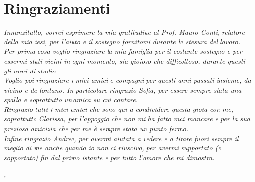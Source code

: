 
\cleardoublepage
{}
{}



\bigskip

\begingroup
\let\clearpage\relax
\let\cleardoublepage\relax
\let\cleardoublepage\relax

\chapter*{Ringraziamenti}

\noindent \textit{Innanzitutto, vorrei esprimere la mia gratitudine al Prof. Mauro Conti, relatore della mia tesi, per l'aiuto e il sostegno fornitomi durante la stesura del lavoro.}\\

\noindent \textit{Per prima cosa voglio ringraziare la mia famiglia per il costante sostegno e per essermi stati vicini in ogni momento, sia gioioso che difficoltoso, durante questi gli anni di studio.}\\

\noindent \textit{Voglio poi ringraziare i miei amici e compagni per questi anni passati insieme, da vicino e da lontano. In particolare ringrazio Sofia, per essere sempre stata una spalla e soprattutto un'amica su cui contare.}\\

\noindent \textit{Ringrazio tutti i miei amici che sono qui a condividere questa gioia con me, soprattutto Clarissa, per l'appoggio che non mi ha fatto mai mancare e per la sua preziosa amicizia che per me è sempre stata un punto fermo.}\\

\noindent \textit{Infine ringrazio Andrea, per avermi aiutata a vedere e a tirare fuori sempre il meglio di me anche quando io non ci riuscivo, per avermi supportato (e sopportato) fin dal primo istante e per tutto l'amore che mi dimostra.}\\
\bigskip

\noindent\textit{\myLocation, \myTime}
\hfill \myName

\endgroup

